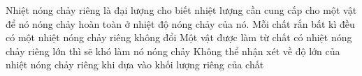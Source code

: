 \begin{ex} 
	Nhiệt nóng chảy riêng là đại lượng cho biết nhiệt lượng cần cung cấp cho một vật để nó nóng chảy hoàn toàn ở nhiệt độ nóng chảy của nó.
	{Mỗi chất rắn bất kì đều có một nhiệt nóng chảy riêng không đổi} 
	{Một vật được làm từ chất có nhiệt nóng chảy riêng lớn thì sẽ khó làm nó nóng chảy} 
	{Không thể nhận xét về độ lớn của nhiệt nóng chảy riêng khi dựa vào khối lượng riêng của chất}
\end{ex}
